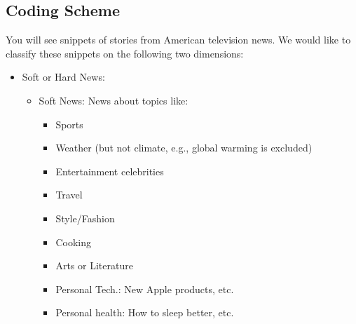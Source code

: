\documentclass[12pt, letterpaper]{article}
\begin{document}
\subsection{Coding Scheme}
\label{appendix:coding_scheme}

You will see snippets of stories from American television news. We would like to classify these snippets on the following two dimensions:

\begin{itemize}

    \item    Soft or Hard News:
        \begin{itemize}
            \item Soft News: News about topics like:
            \begin{itemize}
                \item Sports
                \item Weather (but not climate, e.g., global warming is excluded)
                \item Entertainment celebrities
                \item Travel
                \item Style/Fashion
                \item Cooking
                \item Arts or Literature
                \item Personal Tech.: New Apple products, etc.
                \item Personal health: How to sleep better, etc.
            \end{itemize}


\end{itemize}
\end{itemize}
\end{document}
